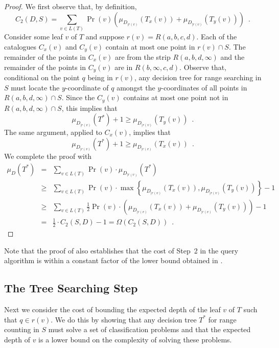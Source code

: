 \documentclass[lotsofwhite,charterfonts]{patmorin}
\newcommand{\leaves}{L}
\begin{document}
\begin{proof}
We first observe that, by definition,
\[
  C_2(D,S) =  \sum_{v\in\leaves(T)} 
              \Pr(v)\left( \mu_{D_{\mid r(v)}}(T_x(v))
                               +  \mu_{D_{\mid r(v)}}(T_y(v)) \right)
           \enspace .
\]
Consider some leaf $v$ of $T$ and suppose $r(v)=R(a,b,c,d)$.  Each of
the catalogues $C_x(v)$ and $C_y(v)$ contain at most one point in
$r(v)\cap S$.  The remainder of the points in $C_x(v)$ are from the
strip $R(a,b,d,\infty)$ and the remainder of the points in $C_y(v)$
are in $R(b,\infty,c,d)$.  Observe that, conditional on the point $q$
being in $r(v)$, any decision tree for range searching in $S$ must
locate the $y$-coordinate of $q$ amongst the $y$-coordinates of all
points in $R(a,b,d,\infty)\cap S$.  Since the $C_y(v)$
contains at most one point not in $R(a,b,d,\infty)\cap S$, this
implies that 
\[
  \mu_{D_{\mid r(v)}}(T^*) + 1 \ge \mu_{D_{\mid r(v)}}(T_y(v)) \enspace .
\]
The same argument, applied to $C_x(v)$, implies that
\[
  \mu_{D_{\mid r(v)}}(T^*) + 1 \ge \mu_{D_{\mid r(v)}}(T_x(v)) \enspace .
\]
We complete the proof with
\begin{eqnarray*}
\mu_D(T^*) 
 & = & \sum_{v\in\leaves(T)} \Pr(v)\cdot\mu_{D_{\mid r(v)}}(T^*) \\
 & \ge & \sum_{v\in\leaves(T)}
	\Pr(v) \cdot\max\left\{\mu_{D_{\mid r(v)}}(T_x(v)), 
		       \mu_{D_{\mid r(v)}}(T_y(v))\right\} - 1 \\
 & \ge & \sum_{v\in\leaves(T)}
	\frac{1}{2}\Pr(v)\cdot\left( \mu_{D_{\mid r(v)}}(T_x(v))
                             +  \mu_{D_{\mid r(v)}}(T_y(v)) \right) - 1 \\
 & = & \frac{1}{2}\cdot C_2(S,D) - 1 = \Omega(C_2(S,D)) \enspace .
\end{eqnarray*}
\end{proof}

Note that the proof of  also establishes that the
cost of Step~2 in the query algorithm is within a constant factor of
the lower bound obtained in .

\subsection{The Tree Searching Step}

Next we consider the cost of bounding the expected depth of the leaf
$v$ of $T$ such that $q\in r(v)$.  We do this by showing that any
decision tree $T^*$ for range counting in $S$ must solve a set of
classification problems and that the expected depth of $v$ is a lower
bound on the complexity of solving these problems.
\end{document}
